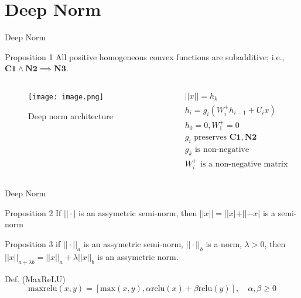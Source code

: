 \documentclass{beamer}
\begin{document}
\section{Deep Norm}
\begin{frame}{Deep Norm}
    \begin{block}{Proposition 1}
        All positive homogeneous convex functions are subadditive; i.e., $\textbf{C1} \wedge \textbf{N2} \implies \textbf{N3}$.
    \end{block}

    \begin{columns}
    \begin{column}{0.6\textwidth}
    \begin{figure}
        \centering
        \texttt{[image: image.png]}
        \caption{Deep norm architecture}
        \label{fig:enter-label}
    \end{figure}
    \end{column}

    \begin{column}{0.4\textwidth}
    
        \[
        \begin{align*}
            & ||x|| = h_k \\
            & h_i = g_i(W_i^+h_{i - 1} + U_ix) \\
            & h_0 = 0, W_1^+ = 0 \\
            & g_i \text{ preserves } \textbf{C1}, \textbf{N2} \\
            & g_k \text{ is non-negative} \\
            & W_i^+ \text{ is a non-negative matrix}
        \end{align*}
        \]
        
    \end{column}
    \end{columns}
\end{frame}

\begin{frame}{Deep Norm}

    \begin{block}{Proposition 2}
        If $||\cdot|$ is an assymetric semi-norm, then  $||x|| = ||x| + ||-x|$ is a semi-norm
    \end{block}

    \begin{block}{Proposition 3}
        if $||\cdot||_a$ is an assymetric semi-norm, $||\cdot||_b$ is a norm, $\lambda > 0$, then $||x||_{a + \lambda b} = ||x||_a + \lambda ||x||_b$ is an assymetric norm.
    \end{block}

    \begin{block}{Def. (MaxReLU)}
    \[
    \text{maxrelu}(x, y) = [\text{max}(x, y), \alpha \text{relu}(x) + \beta \text{relu}(y)], \quad \alpha,\beta \geq 0
    \]
    \end{block}
    
\end{frame}
\end{document}
